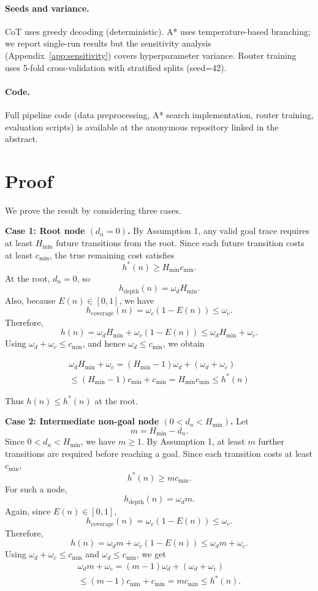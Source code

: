 \documentclass[11pt]{article}
\begin{document}
\paragraph{Seeds and variance.} CoT uses greedy decoding (deterministic). A* uses temperature-based branching; we report single-run results but the sensitivity analysis (Appendix~\ref{app:sensitivity}) covers hyperparameter variance. Router training uses 5-fold cross-validation with stratified splits (seed=42).

\paragraph{Code.} Full pipeline code (data preprocessing, A* search implementation, router training, evaluation scripts) is available at the anonymous repository linked in the abstract.




\section{Proof}\label{full-proof}

We prove the result by considering three cases.

\textbf{Case 1: Root node \((d_n=0)\).}
By Assumption 1, any valid goal trace requires at least \(H_{\min}\) future transitions from the root. Since each future transition costs at least \(c_{\min}\), the true remaining cost satisfies
\[
h^*(n) \geq H_{\min}c_{\min}.
\]
At the root, \(d_n=0\), so
\[
h_{\mathrm{depth}}(n)=\omega_d H_{\min}.
\]
Also, because \(E(n)\in[0,1]\), we have
\[
h_{\mathrm{coverage}}(n)=\omega_c(1-E(n)) \leq \omega_c.
\]
Therefore,
\[
h(n) = \omega_d H_{\min} + \omega_c(1-E(n))
      \leq \omega_d H_{\min} + \omega_c.
\]
Using \(\omega_d+\omega_c \leq c_{\min}\), and hence \(\omega_d \leq c_{\min}\), we obtain


\begin{multline}
    \omega_d H_{\min} + \omega_c
= (H_{\min}-1)\omega_d + (\omega_d+\omega_c) \\
\leq (H_{\min}-1)c_{\min}+c_{\min}
= H_{\min}c_{\min}
\leq h^*(n)
\end{multline}


Thus \(h(n)\leq h^*(n)\) at the root.

\textbf{Case 2: Intermediate non-goal node \((0<d_n<H_{\min})\).}
Let
\[
m = H_{\min}-d_n.
\]
Since \(0<d_n<H_{\min}\), we have \(m\geq 1\). By Assumption 1, at least \(m\) further transitions are required before reaching a goal. Since each transition costs at least \(c_{\min}\),
\[
h^*(n) \geq m c_{\min}.
\]
For such a node,
\[
h_{\mathrm{depth}}(n)=\omega_d m.
\]
Again, since \(E(n)\in[0,1]\),
\[
h_{\mathrm{coverage}}(n)=\omega_c(1-E(n))\leq \omega_c.
\]
Therefore,
\[
h(n)=\omega_d m+\omega_c(1-E(n))
\leq \omega_d m+\omega_c.
\]
Using \(\omega_d+\omega_c\leq c_{\min}\) and \(\omega_d\leq c_{\min}\), we get
\begin{multline}
    \omega_d m+\omega_c
= (m-1)\omega_d+(\omega_d+\omega_c) \\
\leq (m-1)c_{\min}+c_{\min}
= m c_{\min}
\leq h^*(n).
\end{multline}
\end{document}
